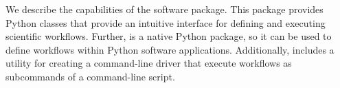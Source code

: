 We describe the capabilities of the  software package.
This package provides Python classes that provide an intuitive interface
for defining and executing scientific workflows.  Further, 
is a native Python package, so it can be used to define workflows within
Python software applications.  Additionally,  includes a utility
for creating a command-line driver that execute workflows as subcommands of a command-line script.
